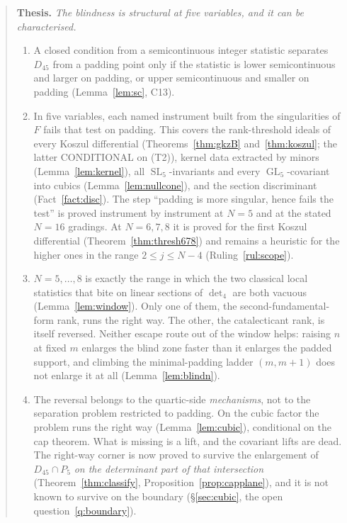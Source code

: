 \documentclass[11pt]{amsart}
\theoremstyle{plain}
\theoremstyle{definition}
\theoremstyle{remark}
\DeclareMathOperator{\GL}{GL}
\DeclareMathOperator{\SL}{SL}
\newcommand{\Dff}{D_{45}}
\newcommand{\Pf}{P_{5}}
\newcommand{\cid}[1]{\textsf{#1}}
\begin{document}
\begin{quote}
\textbf{Thesis.} \emph{The blindness is structural at five variables, and it can be
characterised.}
\begin{enumerate}
\item[(a)] A closed condition from a semicontinuous integer statistic separates $\Dff$ from a
padding point only if the statistic is lower semicontinuous and larger on padding, or upper
semicontinuous and smaller on padding (Lemma~\ref{lem:sc}, \cid{C13}).
\item[(b)] In five variables, each named instrument built from the singularities of $F$ fails
that test on padding. This covers the rank-threshold ideals of every Koszul differential
(Theorems~\ref{thm:gkzB} and~\ref{thm:koszul}; the latter CONDITIONAL on (T2)), kernel data
extracted by minors (Lemma~\ref{lem:kernel}), all $\SL_5$-invariants and every
$\GL_5$-covariant into cubics (Lemma~\ref{lem:nullcone}), and the section discriminant
(Fact~\ref{fact:disc}). The step ``padding is more singular, hence fails the test'' is proved
instrument by instrument at $N=5$ and at the stated $N=16$ gradings. At $N=6,7,8$ it is proved
for the first Koszul differential (Theorem~\ref{thm:thresh678}) and remains a heuristic for the
higher ones in the range $2\le j\le N-4$ (Ruling~\ref{rul:scope}).
\item[(c)] $N=5,\dots,8$ is exactly the range in which the two classical local statistics that
bite on linear sections of $\det_4$ are both vacuous (Lemma~\ref{lem:window}). Only one of
them, the second-fundamental-form rank, runs the right way. The other, the catalecticant rank,
is itself reversed. Neither escape route out of the window helps: raising $n$ at fixed $m$
enlarges the blind zone faster than it enlarges the padded support, and climbing the
minimal-padding ladder $(m,m+1)$ does not enlarge it at all (Lemma~\ref{lem:blindn}).
\item[(d)] The reversal belongs to the quartic-side \emph{mechanisms}, not to the separation
problem restricted to padding. On the cubic factor the problem runs the right way
(Lemma~\ref{lem:cubic}), conditional on the cap theorem. What is missing is a lift, and the
covariant lifts are dead. The right-way corner is now proved to survive the enlargement of
$\Dff\cap\Pf$ \emph{on the determinant part of that intersection}
(Theorem~\ref{thm:classify}, Proposition~\ref{prop:capplane}), and it is not known to survive on
the boundary (\S\ref{sec:cubic}, the open question~\ref{q:boundary}).
\end{enumerate}
\end{quote}
\end{document}
